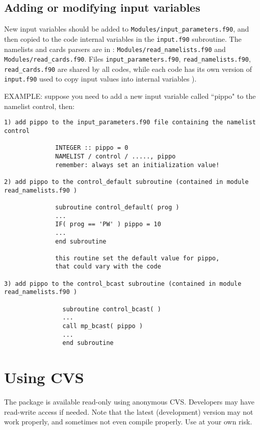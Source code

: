 \documentclass[12pt,a4paper]{article}
\begin{document}
\subsection{Adding or modifying input variables}

New input variables should be added to \texttt{Modules/input\_parameters.f90}, 
and then copied to the code internal variables in the \texttt{input.f90}
subroutine. The namelists and cards parsers are in :
\texttt{Modules/read\_namelists.f90} and \texttt{Modules/read\_cards.f90}.
Files \texttt{input\_parameters.f90}, \texttt{read\_namelists.f90},
\texttt{read\_cards.f90} are shared by all codes, while each code 
has its own version of \texttt{input.f90}  used to copy input values 
into internal variables ).

EXAMPLE:
suppose you need to add a new input variable called ``pippo"
to the namelist control, then:

\begin{verbatim}
1) add pippo to the input_parameters.f90 file containing the namelist
control

              INTEGER :: pippo = 0
              NAMELIST / control / ....., pippo
              remember: always set an initialization value!

2) add pippo to the control_default subroutine (contained in module
read_namelists.f90 )

              subroutine control_default( prog )
              ...
              IF( prog == 'PW' ) pippo = 10
              ...
              end subroutine

              this routine set the default value for pippo,
              that could vary with the code

3) add pippo to the control_bcast subroutine (contained in module 
read_namelists.f90 )

                subroutine control_bcast( )
                ...
                call mp_bcast( pippo )
                ...
                end subroutine
\end{verbatim}

\section{Using CVS}

\label{cvs}
The package is available read-only using anonymous CVS. Developers 
may have read-write access if needed. Note that the latest
(development) version may not work properly, and sometimes not 
even compile properly. Use at your own risk.
\end{document}
